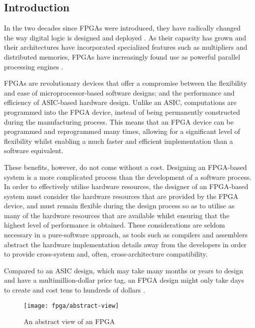 \subsection{Introduction}
\label{fpga:introduction}
In the two decades since \glspl{FPGA} were introduced, they have radically
changed the way digital logic is designed and deployed \cite{Hauck:2007}. As
their capacity has grown and their architectures have incorporated specialized
features such as multipliers and distributed memories, \glspl{FPGA} have
increasingly found use as powerful parallel processing engines
\cite{Berkeley:2010}.

\glspl{FPGA} are revolutionary devices that offer a compromise between the
flexibility and ease of microprocessor-based software designs; and the
performance and efficiency of \gls{ASIC}-based hardware design. Unlike an
\gls{ASIC}, computations are programmed into the \gls{FPGA} device, instead of
being permanently constructed during the manufacturing process. This means that
an \gls{FPGA} device can be programmed and reprogrammed many times, allowing for
a significant level of flexibility whilst enabling a much faster and efficient
implementation than a software equivalent.

These benefits, however, do not come without a cost. Designing an
\gls{FPGA}-based system is a more complicated process than the development of a
software process. In order to effectively utilise hardware resources, the
designer of an \gls{FPGA}-based system must consider the hardware resources that
are provided by the \gls{FPGA} device, and must remain flexible during the
design process so as to utilise as many of the hardware resources that are
available whilst ensuring that the highest level of performance is obtained.
These considerations are seldom necessary in a pure-software approach, as tools
such as compilers and assemblers abstract the hardware implementation details
away from the developers in order to provide cross-system and, often,
cross-architecture compatibility.

Compared to an \gls{ASIC} design, which may take many months or years to design
and have a multimillion-dollar price tag, an \gls{FPGA} design might only take
days to create and cost tens to hundreds of dollars \cite{Hauck:2007}.

\begin{figure}
    \centering
    \texttt{[image: fpga/abstract-view]}
    \caption[An abstract view of an \gls{FPGA}]{An abstract view of an
        \gls{FPGA} \cite{Hauck:2007}}
    \label{fig:fpga:abstract}
\end{figure}

